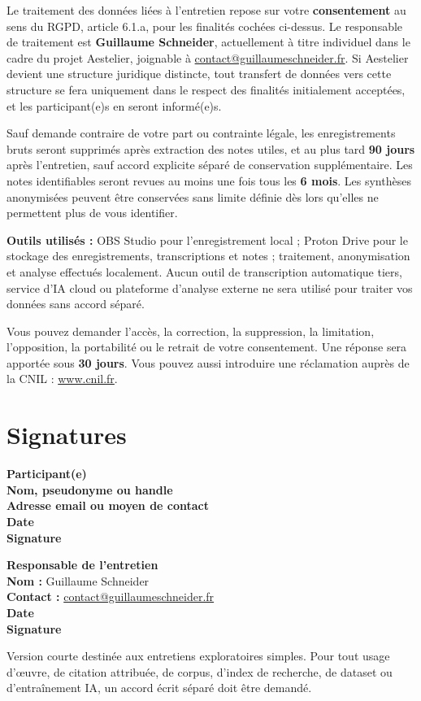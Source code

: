 \documentclass[10pt,a4paper]{article}
\newcommand{\fieldline}[1]{\textbf{#1}\hspace{0.4em}\hrulefill}
\newcommand{\smallnote}[1]{{\small\color{AestelierMuted}#1}}
\begin{document}
Le traitement des données liées à l'entretien repose sur votre \textbf{consentement} au sens du RGPD, article 6.1.a, pour les finalités cochées ci-dessus. Le responsable de traitement est \textbf{Guillaume Schneider}, actuellement à titre individuel dans le cadre du projet Aestelier, joignable à \href{mailto:contact@guillaumeschneider.fr}{contact@guillaumeschneider.fr}. Si Aestelier devient une structure juridique distincte, tout transfert de données vers cette structure se fera uniquement dans le respect des finalités initialement acceptées, et les participant(e)s en seront informé(e)s.

Sauf demande contraire de votre part ou contrainte légale, les enregistrements bruts seront supprimés après extraction des notes utiles, et au plus tard \textbf{90 jours} après l'entretien, sauf accord explicite séparé de conservation supplémentaire. Les notes identifiables seront revues au moins une fois tous les \textbf{6 mois}. Les synthèses anonymisées peuvent être conservées sans limite définie dès lors qu'elles ne permettent plus de vous identifier.

\textbf{Outils utilisés :} OBS Studio pour l'enregistrement local ; Proton Drive pour le stockage des enregistrements, transcriptions et notes ; traitement, anonymisation et analyse effectués localement. Aucun outil de transcription automatique tiers, service d'IA cloud ou plateforme d'analyse externe ne sera utilisé pour traiter vos données sans accord séparé.

Vous pouvez demander l'accès, la correction, la suppression, la limitation, l'opposition, la portabilité ou le retrait de votre consentement. Une réponse sera apportée sous \textbf{30 jours}. Vous pouvez aussi introduire une réclamation auprès de la CNIL : \href{https://www.cnil.fr}{www.cnil.fr}.

\section{Signatures}

\vspace{0.5em}

\noindent
\begin{minipage}[t]{0.47\linewidth}
  \textbf{Participant(e)}\\[1.1em]
  \fieldline{Nom, pseudonyme ou handle}\\[1.7em]
  \fieldline{Adresse email ou moyen de contact}\\[1.7em]
  \fieldline{Date}\\[2.4em]
  \fieldline{Signature}
\end{minipage}%
\hfill
\begin{minipage}[t]{0.47\linewidth}
  \textbf{Responsable de l'entretien}\\[1.1em]
  \textbf{Nom :} Guillaume Schneider\\[1.7em]
  \textbf{Contact :} \href{mailto:contact@guillaumeschneider.fr}{contact@guillaumeschneider.fr}\\[1.7em]
  \fieldline{Date}\\[2.4em]
  \fieldline{Signature}
\end{minipage}

\vspace{1.2em}

\smallnote{Version courte destinée aux entretiens exploratoires simples. Pour tout usage d'œuvre, de citation attribuée, de corpus, d'index de recherche, de dataset ou d'entraînement IA, un accord écrit séparé doit être demandé.}
\end{document}
